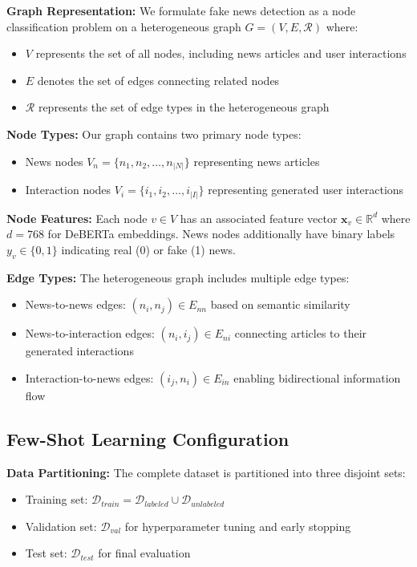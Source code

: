 \textbf{Graph Representation:} We formulate fake news detection as a node classification problem on a heterogeneous graph $G = (V, E, \mathcal{R})$ where:
\begin{itemize}
\item $V$ represents the set of all nodes, including news articles and user interactions
\item $E$ denotes the set of edges connecting related nodes  
\item $\mathcal{R}$ represents the set of edge types in the heterogeneous graph
\end{itemize}

\textbf{Node Types:} Our graph contains two primary node types:
\begin{itemize}
\item News nodes $V_n = \{n_1, n_2, \ldots, n_{|N|}\}$ representing news articles
\item Interaction nodes $V_i = \{i_1, i_2, \ldots, i_{|I|}\}$ representing generated user interactions
\end{itemize}

\textbf{Node Features:} Each node $v \in V$ has an associated feature vector $\mathbf{x}_v \in \mathbb{R}^d$ where $d = 768$ for DeBERTa embeddings. News nodes additionally have binary labels $y_v \in \{0, 1\}$ indicating real (0) or fake (1) news.

\textbf{Edge Types:} The heterogeneous graph includes multiple edge types:
\begin{itemize}
\item News-to-news edges: $(n_i, n_j) \in E_{nn}$ based on semantic similarity
\item News-to-interaction edges: $(n_i, i_j) \in E_{ni}$ connecting articles to their generated interactions  
\item Interaction-to-news edges: $(i_j, n_i) \in E_{in}$ enabling bidirectional information flow
\end{itemize}

\subsection{Few-Shot Learning Configuration}

\textbf{Data Partitioning:} The complete dataset is partitioned into three disjoint sets:
\begin{itemize}
\item Training set: $\mathcal{D}_{train} = \mathcal{D}_{labeled} \cup \mathcal{D}_{unlabeled}$
\item Validation set: $\mathcal{D}_{val}$ for hyperparameter tuning and early stopping
\item Test set: $\mathcal{D}_{test}$ for final evaluation
\end{itemize}

